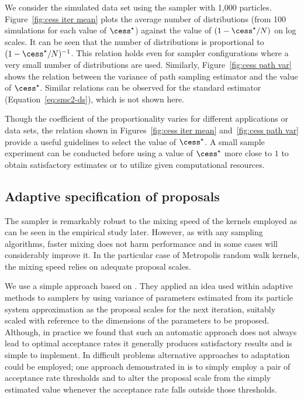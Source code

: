 We consider the simulated \pet data set using the \smc[2] sampler with 1,000 particles. Figure~\ref{fig:cess iter mean} plots the average number of distributions (from 100 simulations for each value of $\cess^\star$) against the value of $(1 - \cess^\star/N)$ on log scales. It can be seen that the number of distributions is proportional to $(1 - \cess^\star/N)^{-1}$. This relation holds even for sampler configurations where a very small number of distributions are used. Similarly, Figure~\ref{fig:cess path var} shows the relation between the variance of path sampling estimator and the value of $\cess^\star$. Similar relations can be observed for the standard estimator (Equation~\eqref{eq:smc2-ds}), which is not shown here.




Though the coefficient of the proportionality varies for different applications or data sets, the relation shown in Figures~\ref{fig:cess iter mean} and~\ref{fig:cess path var} provide a useful guidelines to select the value of $\cess^\star$. A small sample experiment can be conducted before using a value of $\cess^\star$ more close to $1$ to obtain satisfactory estimates or to utilize given computational resources.

\subsection{Adaptive specification of proposals}
\label{sub:Adaptive specification of proposals}

The \smc sampler is remarkably robust to the mixing speed of the \mcmc kernels employed as can be seen in the empirical study later. However, as with any sampling algorithms, faster mixing does not harm performance and in some cases will considerably improve it. In the particular case of Metropolis random walk kernels, the mixing speed relies on adequate proposal scales.

We use a simple approach based on \cite{Jasra:2010eh}. They applied an idea used within adaptive \mcmc methods \cite{Andrieu:2006tw} to \smc samplers by using variance of parameters estimated from its particle system approximation as the proposal scales for the next iteration, suitably scaled with reference to the dimensions of the parameters to be proposed. Although, in practice we found that such an automatic approach does not always lead to optimal acceptance rates it generally produces satisfactory results and is simple to implement. In difficult problems alternative approaches to adaptation could be employed; one approach demonstrated in \cite{Jasra:2010eh} is to simply employ a pair of acceptance rate thresholds and to alter the proposal scale from the simply estimated value whenever the acceptance rate falls outside those thresholds.


